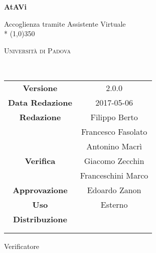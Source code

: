 \documentclass[a4paper,12pt]{article}
\date{2017/05/06}
\begin{document}
	\begin{titlepage}
		\centering
		{\huge\bfseries AtAVi\par}
		Accoglienza tramite Assistente Virtuale \\*
		\line(1,0){350} \\
		{\scshape\LARGE Università di Padova \par}
		\vspace{1cm}
		{\scshape\Large \manualeutenteRA\ \par}
		\logo
		\newpage
		\begin{tabular}{c|c}
			{\hfill \textbf{Versione}} 			& 2.0.0			\\ 
			{\hfill\textbf{Data Redazione}} 	& 2017-05-06 		\\ 
			{\hfill\textbf{Redazione}} 			& Filippo Berto \\ & Francesco Fasolato \\ & Antonino Macrì \\
			{\hfill\textbf{Verifica}} 				& Giacomo Zecchin \\  & Franceschini Marco \\
			{\hfill\textbf{Approvazione}} 		& Edoardo Zanon \\
			{\hfill\textbf{Uso}} 				& Esterno 			\\
			{\hfill\textbf{Distribuzione}} 		& \vardanega \\ & \cardin \\ & \prop \\
		\end{tabular}
	\end{titlepage}
	
	\pagestyle{myfront}
	\newpage	
			

	\newpage
		\tableofcontents 	%
	\newpage
		\listoftables 		%
	\newpage	
		\listoffigures		%
	
	\label{LastFrontPage}
		\newpage
		\pagestyle{mymain}
		
		\newpage
		
		\newpage
		
		\newpage
		
		Verificatore\newpage
		
		\newpage
		

		\glsaddall	%
		\newpage

			\appendix

			\printglossary[style=myaltlistgroup] %
		
	\label{LastPage}
\end{document}
